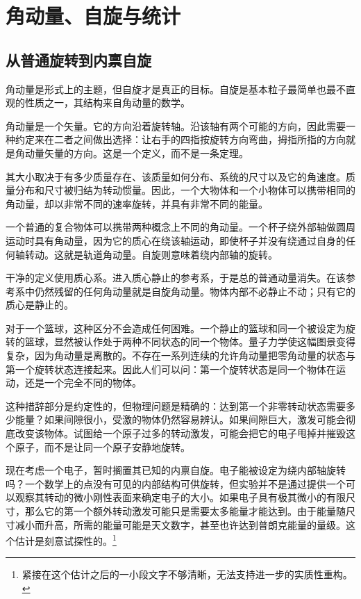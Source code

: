 \chapter{角动量、自旋与统计}

\section{从普通旋转到内禀自旋}

角动量是形式上的主题，但自旋才是真正的目标。自旋是基本粒子最简单也最不直观的性质之一，其结构来自角动量的数学。

角动量是一个矢量。它的方向沿着旋转轴。沿该轴有两个可能的方向，因此需要一种约定来在二者之间做出选择：让右手的四指按旋转方向弯曲，拇指所指的方向就是角动量矢量的方向。这是一个定义，而不是一条定理。

其大小取决于有多少质量存在、该质量如何分布、系统的尺寸以及它的角速度。质量分布和尺寸被归结为转动惯量。因此，一个大物体和一个小物体可以携带相同的角动量，却以非常不同的速率旋转，并具有非常不同的能量。

一个普通的复合物体可以携带两种概念上不同的角动量。一个杯子绕外部轴做圆周运动时具有角动量，因为它的质心在绕该轴运动，即使杯子并没有绕通过自身的任何轴转动。这就是轨道角动量。自旋则意味着绕内部轴的旋转。

干净的定义使用质心系。进入质心静止的参考系，于是总的普通动量消失。在该参考系中仍然残留的任何角动量就是自旋角动量。物体内部不必静止不动；只有它的质心是静止的。

对于一个篮球，这种区分不会造成任何困难。一个静止的篮球和同一个被设定为旋转的篮球，显然被认作处于两种不同状态的同一个物体。量子力学使这幅图景变得复杂，因为角动量是离散的。不存在一系列连续的允许角动量把零角动量的状态与第一个旋转状态连接起来。因此人们可以问：第一个旋转状态是同一个物体在运动，还是一个完全不同的物体。

这种措辞部分是约定性的，但物理问题是精确的：达到第一个非零转动状态需要多少能量？如果间隙很小，受激的物体仍然容易辨认。如果间隙巨大，激发可能会彻底改变该物体。试图给一个原子过多的转动激发，可能会把它的电子甩掉并摧毁这个原子，而不是让同一个原子安静地旋转。

现在考虑一个电子，暂时搁置其已知的内禀自旋。电子能被设定为绕内部轴旋转吗？一个数学上的点没有可见的内部结构可供旋转，但实验并不是通过提供一个可以观察其转动的微小刚性表面来确定电子的大小。如果电子具有极其微小的有限尺寸，那么它的第一个额外转动激发可能只是需要太多能量才能达到。由于能量随尺寸减小而升高，所需的能量可能是天文数字，甚至也许达到普朗克能量的量级。这个估计是刻意试探性的。\footnote{紧接在这个估计之后的一小段文字不够清晰，无法支持进一步的实质性重构。}

